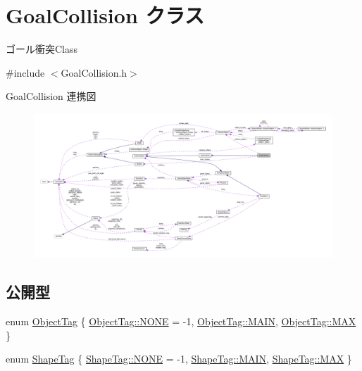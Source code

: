 \hypertarget{class_goal_collision}{}\section{Goal\+Collision クラス}
\label{class_goal_collision}


ゴール衝突\+Class  




{\ttfamily \#include $<$Goal\+Collision.\+h$>$}



Goal\+Collision 連携図\nopagebreak
\begin{figure}[H]
\begin{center}
\leavevmode
\includegraphics[width=350pt]{class_goal_collision__coll__graph}
\end{center}
\end{figure}
\subsection*{公開型}
\begin{DoxyCompactItemize}
\item 
enum \mbox{\hyperlink{class_goal_collision_a8d0d760973816d9086df90491f38ff62}{Object\+Tag}} \{ \mbox{\hyperlink{class_goal_collision_a8d0d760973816d9086df90491f38ff62ab50339a10e1de285ac99d4c3990b8693}{Object\+Tag\+::\+N\+O\+NE}} = -\/1, 
\mbox{\hyperlink{class_goal_collision_a8d0d760973816d9086df90491f38ff62a186495f7da296bf880df3a22a492b378}{Object\+Tag\+::\+M\+A\+IN}}, 
\mbox{\hyperlink{class_goal_collision_a8d0d760973816d9086df90491f38ff62a26a4b44a837bf97b972628509912b4a5}{Object\+Tag\+::\+M\+AX}}
 \}
\item 
enum \mbox{\hyperlink{class_goal_collision_a17ee6594eca92454cd9d4c91a0b781b5}{Shape\+Tag}} \{ \mbox{\hyperlink{class_goal_collision_a17ee6594eca92454cd9d4c91a0b781b5ab50339a10e1de285ac99d4c3990b8693}{Shape\+Tag\+::\+N\+O\+NE}} = -\/1, 
\mbox{\hyperlink{class_goal_collision_a17ee6594eca92454cd9d4c91a0b781b5a186495f7da296bf880df3a22a492b378}{Shape\+Tag\+::\+M\+A\+IN}}, 
\mbox{\hyperlink{class_goal_collision_a17ee6594eca92454cd9d4c91a0b781b5a26a4b44a837bf97b972628509912b4a5}{Shape\+Tag\+::\+M\+AX}}
 \}
\end{DoxyCompactItemize}
